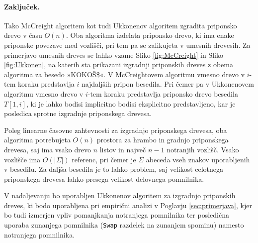 \paragraph{Zaključek.}
Tako McCreight algoritem \cite{McCreight1976} kot tudi  Ukkonenov algoritem \cite{Ukkonen1995} zgradita priponsko drevo v času $O(n)$. Oba algoritma izdelata priponsko drevo, ki ima enake priponske povezave med vozlišči, pri tem pa se zalikujeta v umesnih drevesih. Za primerjavo umesnih dreves se lahko vzame Sliko \ref{fig:McCreight} in Sliko \ref{fig:Ukkonen}, na katerih sta prikazani izgradnji priponskih dreves z obema algoritma za besedo »KOKOŠ\$«. V McCreightovem algoritmu vmesno drevo v $i$-tem koraku predstavlja $i$ najdaljših pripon besedila. Pri čemer pa v Ukkonenovem algoritmu vmesno drevo v $i$-tem koraku predstavlja priponsko drevo besedila $T[1,i]$, ki je lahko bodisi implicitno bodisi eksplicitno predstavljeno, kar je posledica sprotne izgradnje priponskega drevesa.

Poleg linearne časovne zahtevnosti za izgradnjo priponskega drevesa, oba algoritma potrebujeta $O(n)$ prostora za hrambo in gradnjo priponskega drevesa, saj ima vsako drevo $n$ listov in največ $n-1$ notranjih vozlišč. Vsako vozlišče ima $O(|\Sigma|)$ referenc, pri čemer je $\Sigma$ abeceda vseh znakov uporabljenih v besedilu. Za daljša besedila je to lahko problem, saj velikost celotnega priponskega drevesa lahko presega velikost delovnega pomnilnika.

V nadaljevanju bo uporabljen Ukkonenov algoritem za izgradnjo priponskih dreves, ki bodo uporabljena pri empirični analizi v Poglavju \ref{sec:primerjava}, kjer bo tudi izmerjen vpliv pomanjkanja notranjega pomnilnika ter posledična uporaba zunanjega pomnilnika (\verb|Swap| razdelek na zunanjem spominu) namesto notranjega pomnilnika.